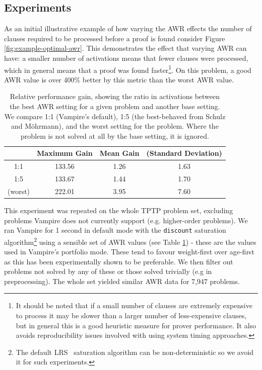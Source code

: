 \documentclass{llncs}
\newcommand{\sandm}{Schulz and M{\"{o}}hrmann}
\begin{document}
\subsection{Experiments}
As an initial illustrative example of how varying the AWR effects the number of clauses required to be processed before a proof is found consider Figure \ref{fig:example-optimal-awr}. This demonstrates the effect that varying AWR can have: a smaller number of activations means that fewer clauses were processed, which in general means that a proof was found faster\footnote{
It should be noted that if a small number of clauses are extremely expensive to process it may be slower than a larger number of less-expensive clauses, but in general this is a good heuristic measure for prover performance.
It also avoids reproducibility issues involved with using system timing approaches.
}.
On this problem, a good AWR value is over 400\% better by this metric than the worst AWR value.

\begin{table}[t]
	\caption{
Relative performance gain, showing the ratio in activations between the best AWR setting for a given problem and another base setting.
We compare  1:1 (Vampire's default), 1:5 (the best-behaved from \sandm), and the worst setting for the problem.
Where the problem is not solved at all by the base setting, it is ignored.
}
	\centering
	\begin{tabular}{c | c | c c}
		& Maximum Gain & Mean Gain & (Standard Deviation)\\
		\hline
		1:1 & 133.56 & 1.26 & 1.63 \\
		1:5 & 133.67 & 1.44 & 1.70 \\
		(worst) & 222.01 & 3.95 & 7.60 \\
	\end{tabular}
	\label{tab:awr-improvement}
\end{table}

This experiment was repeated on the whole TPTP problem set, excluding problems Vampire does not currently support (e.g. higher-order problems). We ran Vampire for 1 second in default mode with the \texttt{discount} saturation algorithm\footnote{The default LRS~\cite{LRS} saturation algorithm can be non-deterministic so we avoid it for such experiments.} using a sensible set of AWR values (see Table \ref{tab:awr-improvement}) - these are the values used in Vampire's portfolio mode. These tend to favour weight-first over age-first as this has been experimentally shown to be preferable. We then filter out problems not solved by any of these or those solved trivially (e.g in preprocessing). The whole set yielded similar AWR data for 7,947 problems. 
\end{document}
